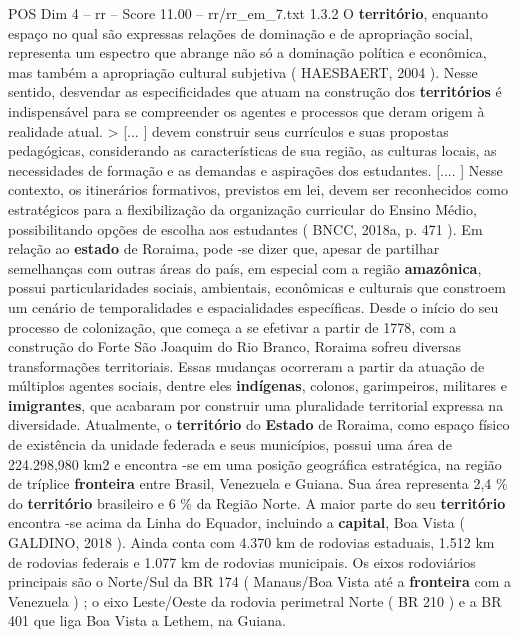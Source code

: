 \begin{textsample}{POS Dim 4 – rr – Score 11.00 – rr/rr\_em\_7.txt}  \label{ex:f4_pos_117}
1.3.2 O \textbf{território}, enquanto espaço no qual são expressas relações de dominação e de apropriação social, representa um espectro que abrange não só a dominação política e econômica, mas também a apropriação cultural subjetiva ( HAESBAERT, 2004 ).
Nesse sentido, desvendar as especificidades que atuam na construção dos \textbf{territórios} é indispensável para se compreender os agentes e processos que deram origem à realidade atual. > [... ] devem construir seus currículos e suas propostas pedagógicas, considerando as características de sua região, as culturas locais, as necessidades de formação e as demandas e aspirações dos estudantes. [.... ] Nesse contexto, os itinerários formativos, previstos em lei, devem ser reconhecidos como estratégicos para a flexibilização da organização curricular do Ensino Médio, possibilitando opções de escolha aos estudantes ( BNCC, 2018a, p. 471 ).
Em relação ao \textbf{estado} de Roraima, pode -se dizer que, apesar de partilhar semelhanças com outras áreas do país, em especial com a região \textbf{amazônica}, possui particularidades sociais, ambientais, econômicas e culturais que constroem um cenário de temporalidades e espacialidades específicas.
Desde o início do seu processo de colonização, que começa a se efetivar a partir de 1778, com a construção do Forte São Joaquim do Rio Branco, Roraima sofreu diversas transformações territoriais.
Essas mudanças ocorreram a partir da atuação de múltiplos agentes sociais, dentre eles \textbf{indígenas}, colonos, garimpeiros, militares e \textbf{imigrantes}, que acabaram por construir uma pluralidade territorial expressa na diversidade.
Atualmente, o \textbf{território} do \textbf{Estado} de Roraima, como espaço físico de existência da unidade federada e seus municípios, possui uma área de 224.298,980 km2 e encontra -se em uma posição geográfica estratégica, na região de tríplice \textbf{fronteira} entre Brasil, Venezuela e Guiana.
Sua área representa 2,4 \% do \textbf{território} brasileiro e 6 \% da Região Norte.
A maior parte do seu \textbf{território} encontra -se acima da Linha do Equador, incluindo a \textbf{capital}, Boa Vista ( GALDINO, 2018 ).
Ainda conta com 4.370 km de rodovias estaduais, 1.512 km de rodovias federais e 1.077 km de rodovias municipais.
Os eixos rodoviários principais são o Norte/Sul da BR 174 ( Manaus/Boa Vista até a \textbf{fronteira} com a Venezuela ) ; o eixo Leste/Oeste da rodovia perimetral Norte ( BR 210 ) e a BR 401 que liga Boa Vista a Lethem, na Guiana.

\end{textsample}
